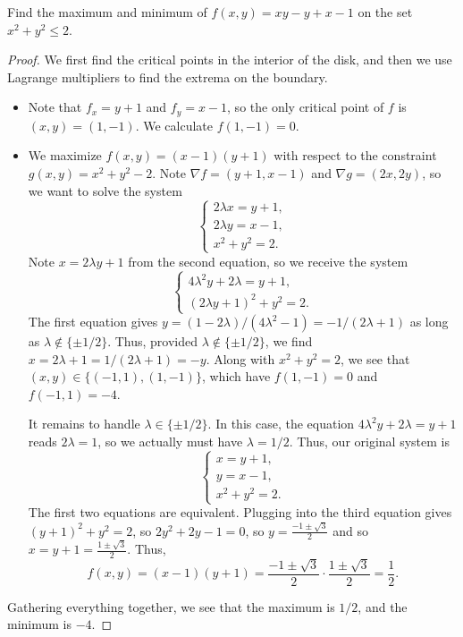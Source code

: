 \documentclass[openany]{book}
\begin{document}
\begin{prob}[30]
    Find the maximum and minimum of \( f(x, y) = xy - y + x - 1 \) on the set \( x^2 + y^2 \leq 2 \).
\end{prob}
\begin{proof}
    We first find the critical points in the interior of the disk, and then we use Lagrange multipliers to find the extrema on the boundary.
    \begin{itemize}
        \item Note that $f_x=y+1$ and $f_y=x-1$, so the only critical point of $f$ is $(x,y)=(1,-1)$. We calculate $f(1,-1)=0$. %
        \item We maximize $f(x,y)=(x-1)(y+1)$ with respect to the constraint $g(x,y)=x^2+y^2-2$. Note $\nabla f=(y+1,x-1)$ and $\nabla g=(2x,2y)$, so we want to solve the system
        \[\begin{cases}
            2\lambda x=y+1, \\
            2\lambda y=x-1, \\
            x^2+y^2=2.
        \end{cases}\]
        Note $x=2\lambda y+1$ from the second equation, so we receive the system
        \[\begin{cases}
            4\lambda^2y+2\lambda=y+1, \\
            (2\lambda y+1)^2+y^2=2.
        \end{cases}\]
        The first equation gives $y=(1-2\lambda)/\left(4\lambda^2-1\right)=-1/(2\lambda+1)$ as long as $\lambda\notin\{\pm1/2\}$. Thus, provided $\lambda\notin\{\pm1/2\}$, we find $x=2\lambda+1=1/(2\lambda+1)=-y$. Along with $x^2+y^2=2$, we see that $(x,y)\in\{(-1,1),(1,-1)\}$, which have $f(1,-1)=0$ and $f(-1,1)=-4$.

        It remains to handle $\lambda\in\{\pm1/2\}$. In this case, the equation $4\lambda^2y+2\lambda=y+1$ reads $2\lambda=1$, so we actually must have $\lambda=1/2$. Thus, our original system is
        \[\begin{cases}
            x=y+1, \\
            y=x-1, \\
            x^2+y^2=2.
        \end{cases}\]
        The first two equations are equivalent. Plugging into the third equation gives $(y+1)^2+y^2=2$, so $2y^2+2y-1=0$, so $y=\frac{-1\pm\sqrt3}2$ and so $x=y+1=\frac{1\pm\sqrt3}2$. Thus,
        \[f(x,y)=(x-1)(y+1)=\frac{-1\pm\sqrt3}2\cdot\frac{1\pm\sqrt3}2=\frac12.\]
    \end{itemize}
    Gathering everything together, we see that the maximum is $1/2$, and the minimum is $-4$.
\end{proof}
\end{document}
